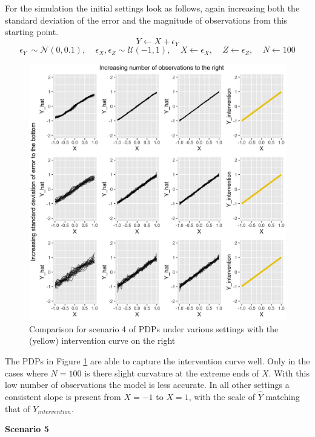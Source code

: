 \documentclass[]{krantz}
\begin{document}
For the simulation the initial settings look as follows, again
increasing both the standard deviation of the error and the magnitude of
observations from this starting point.
\[ Y \leftarrow X + \epsilon_Y  \]
\[ \epsilon_Y ~ \sim \mathcal{N}(0, 0.1), \ \ \ \ \ \epsilon_X, \epsilon_Z \sim \mathcal{U}(-1,1), \ \ \ \ \ X \leftarrow \epsilon_X,\ \ \ \ \ Z \leftarrow \epsilon_Z, \ \ \ \ \ N \leftarrow 100 \]

\begin{figure}

\includegraphics[width=1\linewidth]{images/scenario4_all} \hfill{}

\caption{Comparison for scenario 4 of PDPs under various settings with the (yellow) intervention curve on the right}\label{fig:Figure10causal}
\end{figure}

The PDPs in Figure \ref{fig:Figure10causal} are able to capture the
intervention curve well. Only in the cases where \(N=100\) is there
slight curvature at the extreme ends of \(X\). With this low number of
observations the model is less accurate. In all other settings a
consistent slope is present from \(X = -1\) to \(X = 1\), with the scale
of \(\hat{Y}\) matching that of \(Y_{intervention}\).

\textbf{Scenario 5}
\end{document}
